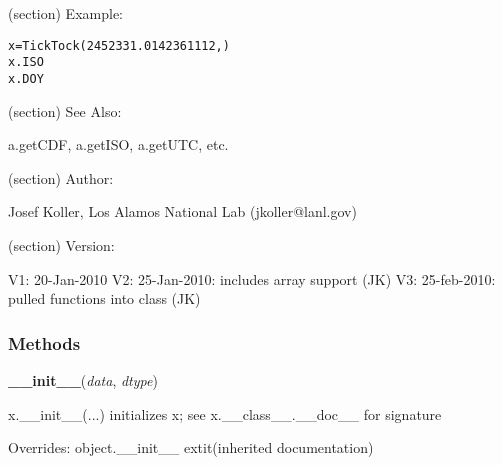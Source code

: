 (section) Example:

\begin{alltt}
\pysrcprompt{{\textgreater}{\textgreater}{\textgreater} }x=TickTock(2452331.0142361112, )
\pysrcprompt{{\textgreater}{\textgreater}{\textgreater} }x.ISO
\pysrcoutput{}\pysrcprompt{{\textgreater}{\textgreater}{\textgreater} }x.DOY 
\end{alltt}
(section) See Also:

  a.getCDF, a.getISO, a.getUTC, etc.

(section) Author:

  Josef Koller, Los Alamos National Lab (jkoller@lanl.gov)

(section) Version:

  V1: 20-Jan-2010 V2: 25-Jan-2010: includes array support (JK) V3: 
  25-feb-2010: pulled functions into class (JK)



  \subsubsection{Methods}

    \vspace{0.5ex}

\hspace{.8\funcindent}\begin{boxedminipage}{\funcwidth}

    \raggedright \textbf{\_\_init\_\_}(\textit{data}, \textit{dtype})

\setlength{\parskip}{2ex}
    x.\_\_init\_\_(...) initializes x; see x.\_\_class\_\_.\_\_doc\_\_ for 
    signature

\setlength{\parskip}{1ex}
      Overrides: object.\_\_init\_\_ 	extit{(inherited documentation)}

    \end{boxedminipage}

    \vspace{0.5ex}

